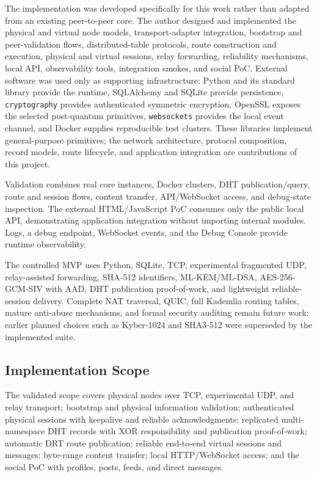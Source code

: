 \documentclass[12pt]{article}
\begin{document}
The implementation was developed specifically for this work rather than adapted from an existing peer-to-peer core. The author designed and implemented the physical and virtual node models, transport-adapter integration, bootstrap and peer-validation flows, distributed-table protocols, route construction and execution, physical and virtual sessions, relay forwarding, reliability mechanisms, local API, observability tools, integration smokes, and social PoC. External software was used only as supporting infrastructure: Python and its standard library provide the runtime, SQLAlchemy and SQLite provide persistence, \texttt{cryptography} provides authenticated symmetric encryption, OpenSSL exposes the selected post-quantum primitives, \texttt{websockets} provides the local event channel, and Docker supplies reproducible test clusters. These libraries implement general-purpose primitives; the network architecture, protocol composition, record models, route lifecycle, and application integration are contributions of this project.

Validation combines real core instances, Docker clusters, DHT publication/query, route and session flows, content transfer, API/WebSocket access, and debug-state inspection. The external HTML/JavaScript PoC consumes only the public local API, demonstrating application integration without importing internal modules. Logs, a debug endpoint, WebSocket events, and the Debug Console provide runtime observability.

The controlled MVP uses Python, SQLite, TCP, experimental fragmented UDP, relay-assisted forwarding, SHA-512 identifiers, ML-KEM/ML-DSA, AES-256-GCM-SIV with AAD, DHT publication proof-of-work, and lightweight reliable-session delivery. Complete NAT traversal, QUIC, full Kademlia routing tables, mature anti-abuse mechanisms, and formal security auditing remain future work; earlier planned choices such as Kyber-1024 and SHA3-512 were superseded by the implemented suite.

\subsection{Implementation Scope}
\label{sec:implementation-scope}

The validated scope covers physical nodes over TCP, experimental UDP, and relay transport; bootstrap and physical information validation; authenticated physical sessions with keepalive and reliable acknowledgments; replicated multi-namespace DHT records with XOR responsibility and publication proof-of-work; automatic DRT route publication; reliable end-to-end virtual sessions and messages; byte-range content transfer; local HTTP/WebSocket access; and the social PoC with profiles, posts, feeds, and direct messages.
\end{document}
